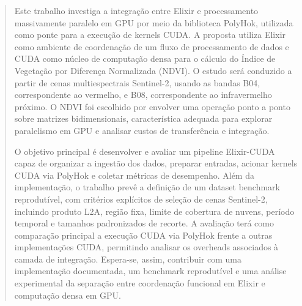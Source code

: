 \documentclass[tcc,capa]{texufpel}
\begin{document}
\begin{abstract}
Este trabalho investiga a integração entre Elixir e processamento massivamente paralelo em GPU por meio da biblioteca PolyHok, utilizada como ponte para a execução de kernels CUDA. A proposta utiliza Elixir como ambiente de coordenação de um fluxo de processamento de dados e CUDA como núcleo de computação densa para o cálculo do Índice de Vegetação por Diferença Normalizada (NDVI). O estudo será conduzido a partir de cenas multiespectrais Sentinel-2, usando as bandas B04, correspondente ao vermelho, e B08, correspondente ao infravermelho próximo. O NDVI foi escolhido por envolver uma operação ponto a ponto sobre matrizes bidimensionais, característica adequada para explorar paralelismo em GPU e analisar custos de transferência e integração.

O objetivo principal é desenvolver e avaliar um pipeline Elixir-CUDA capaz de organizar a ingestão dos dados, preparar entradas, acionar kernels CUDA via PolyHok e coletar métricas de desempenho. Além da implementação, o trabalho prevê a definição de um dataset benchmark reprodutível, com critérios explícitos de seleção de cenas Sentinel-2, incluindo produto L2A, região fixa, limite de cobertura de nuvens, período temporal e tamanhos padronizados de recorte. A avaliação terá como comparação principal a execução CUDA via PolyHok frente a outras implementações CUDA, permitindo analisar os overheads associados à camada de integração. Espera-se, assim, contribuir com uma implementação documentada, um benchmark reprodutível e uma análise experimental da separação entre coordenação funcional em Elixir e computação densa em GPU.
\end{abstract}
\end{document}
